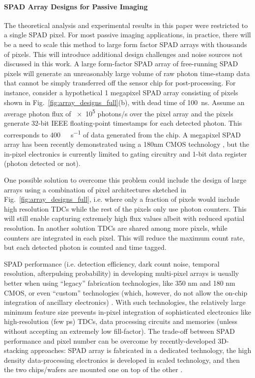 \paragraph{SPAD Array Designs for Passive Imaging}
The theoretical analysis and experimental results in this paper were restricted
to a single SPAD pixel. For most passive imaging applications, in practice,
there will be a need to scale this method to large form factor SPAD arrays with
thousands of pixels. This will introduce additional design challenges and noise
sources not discussed in this work. A large form-factor SPAD array of
free-running SPAD pixels will generate an unreasonably large volume of raw
photon time-stamp data that cannot be simply transferred off the sensor chip
for post-processing. For instance, consider a hypothetical 1 megapixel SPAD
array consisting of pixels shown in Fig.~\ref{fig:array_designs_full}(b), with dead
time of \num{100}~\si{\ns}. Assume an average photon flux of \num{e5} photons/s
over the pixel array and the pixels generate \num{32}-bit IEEE floating-point
timestamps for each detected photon. This corresponds to
\num{400}~\si{\gibi\byte\per\s} of data generated from the chip. A megapixel
SPAD array has been recently demonstrated using a 180nm CMOS technology
\cite{Morimoto_2020} , but the in-pixel electronics is currently limited to
gating circuitry and 1-bit data register (photon detected or not). 

One possible solution to overcome this problem could include the design of
large arrays using a combination of pixel architectures sketched in
Fig.~\ref{fig:array_designs_full}, i.e. where only a fraction of pixels would
include high resolution TDCs while the rest of the pixels only use photon
counters.  This will still enable capturing extremely high flux values albeit
with reduced spatial resolution. In another solution TDCs are shared among more
pixels, while counters are integrated in each pixel. This will reduce the
maximum count rate, but each detected photon is counted and time tagged.

SPAD performance (i.e. detection efficiency, dark count noise, temporal
resolution, afterpulsing probability) in developing multi-pixel arrays is
usually better when using ``legacy'' fabrication technologies, like 350 nm and
180 nm CMOS, or even ``custom'' technologies (which, however, do not allow the
on-chip integration of ancillary electronics) \cite{Ghioni_2007}. With such
technologies, the relatively large minimum feature size prevents in-pixel
integration of sophisticated electronics like high-resolution (few \si{\ps})
TDCs, data processing circuits and memories (unless without accepting an
extremely low fill-factor). The trade-off between SPAD performance and pixel
number can be overcome by recently-developed 3D-stacking approaches:  SPAD
array is fabricated in a dedicated technology, the high density data-processing
electronics is developed in scaled technology, and then the two chips/wafers
are mounted one on top of the other \cite{Henderson_2019_ISSCC,Charbon_2018}.

